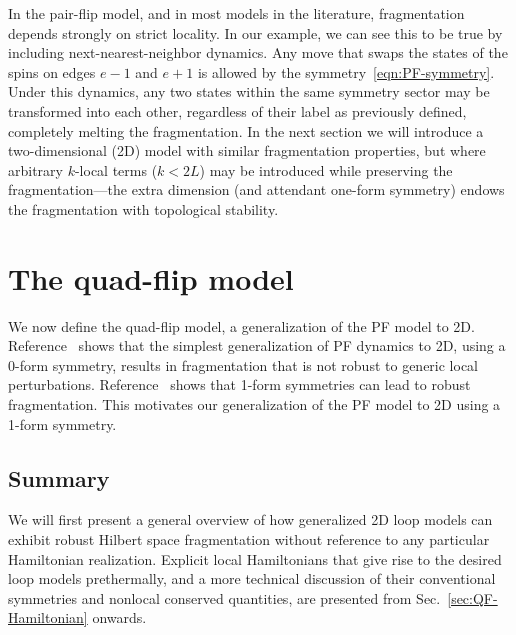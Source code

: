 In the pair-flip model, and in most models in the literature, fragmentation depends strongly on strict locality. In our example, we can see this to be true by including next-nearest-neighbor dynamics. Any move that swaps the states of the spins on edges $e-1$ and $e+1$ is allowed by the symmetry~\eqref{eqn:PF-symmetry}. Under this dynamics, any two states within the same symmetry sector may be transformed into each other, regardless of their label as previously defined, completely melting the fragmentation. In the next section we will introduce a two-dimensional (2D) model with similar fragmentation properties, but where arbitrary $k$-local terms ($k<2L$) may be introduced while preserving the fragmentation---the extra dimension (and attendant one-form symmetry) endows the fragmentation with topological stability. 

 
\section{The quad-flip model}
\label{sec:QF}

We now define the quad-flip model, a generalization of the PF model to 2D. Reference~\cite{Moudgalya2022Commutant} shows that the simplest generalization of PF dynamics to 2D, using a 0-form symmetry, results in fragmentation that is not robust to generic local perturbations. Reference~\cite{Stephen2022Robust} shows that 1-form symmetries can lead to robust fragmentation. This motivates our generalization of the PF model to 2D using a 1-form symmetry.


\subsection{Summary} \label{sub:summary}

We will first present a general overview of how generalized 2D loop models can exhibit robust Hilbert space fragmentation without reference to any particular Hamiltonian realization. Explicit local Hamiltonians that give rise to the desired loop models prethermally, and a more technical discussion of their conventional symmetries and nonlocal conserved quantities, are presented from Sec.~\ref{sec:QF-Hamiltonian} onwards.

